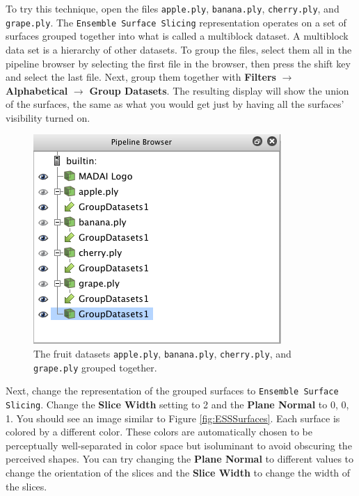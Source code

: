 \documentclass[12pt]{article}
\newcommand{\menu}[1]{\textbf{#1}}
\newcommand{\representation}[1]{\texttt{#1}}
\newcommand{\file}[1]{\texttt{#1}}
\newcommand{\setting}[1]{\textbf{#1}}
\begin{document}
To try this technique, open the files \file{apple.ply}, \file{banana.ply}, \file{cherry.ply}, and \file{grape.ply}. The \representation{Ensemble Surface Slicing} representation operates on a set of surfaces grouped together into what is called a multiblock dataset. A multiblock data set is a hierarchy of other datasets. To group the files, select them all in the pipeline browser by selecting the first file in the browser, then press the shift key and select the last file. Next, group them together with \menu{Filters} $\rightarrow$ \menu{Alphabetical} $\rightarrow$ \menu{Group Datasets}. The resulting display will show the union of the surfaces, the same as what you would get just by having all the surfaces' visibility turned on.

\begin{figure}[htbp]
   \centering
   \includegraphics[scale=.5]{images/ESSGroupDatasets.png} %
   \caption{The fruit datasets \texttt{apple.ply}, \texttt{banana.ply}, \texttt{cherry.ply}, and \texttt{grape.ply} grouped together.}
   \label{fig:ESSGroupDatasets}
\end{figure}

Next, change the representation of the grouped surfaces to \representation{Ensemble Surface Slicing}. Change the \setting{Slice Width} setting to 2 and the \setting{Plane Normal} to 0, 0, 1. You should see an image similar to Figure \ref{fig:ESSSurfaces}. Each surface is colored by a different color. These colors are automatically chosen to be perceptually well-separated in color space but isoluminant to avoid obscuring the perceived shapes. You can try changing the \setting{Plane Normal} to different values to change the orientation of the slices and the \setting{Slice Width} to change the width of the slices.
\end{document}
